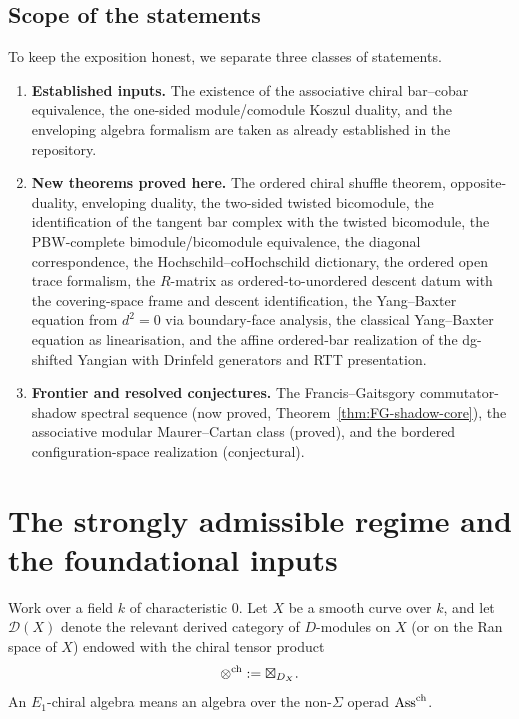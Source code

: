 \subsection*{Scope of the statements}
To keep the exposition honest, we separate three classes of statements.

\begin{enumerate}[label=(\roman*)]
\item \textbf{Established inputs.}
The existence of the associative chiral bar--cobar equivalence, the one-sided module/comodule
Koszul duality, and the enveloping algebra formalism are taken as already established in the
repository.

\item \textbf{New theorems proved here.}
The ordered chiral shuffle theorem, opposite-duality, enveloping duality, the two-sided twisted
bicomodule, the identification of the tangent bar complex with the twisted bicomodule, the PBW-complete
bimodule/bicomodule equivalence, the diagonal correspondence, the Hochschild--coHochschild
dictionary, the ordered open trace formalism, the $R$-matrix as
ordered-to-unordered descent datum with the covering-space frame and descent identification,
the Yang--Baxter equation from $d^2=0$ via boundary-face analysis, the classical
Yang--Baxter equation as linearisation, and the affine ordered-bar
realization of the dg-shifted Yangian with Drinfeld generators and
RTT presentation.

\item \textbf{Frontier and resolved conjectures.}
The Francis--Gaitsgory commutator-shadow spectral sequence (now proved,
Theorem~\ref{thm:FG-shadow-core}), the associative modular Maurer--Cartan
class (proved), and the bordered configuration-space realization (conjectural).
\end{enumerate}

\section{The strongly admissible regime and the foundational inputs}

Work over a field $k$ of characteristic $0$. Let $X$ be a smooth curve over $k$, and let
$\mathcal D(X)$ denote the relevant derived category of $D$-modules on $X$ (or on the Ran space of
$X$) endowed with the chiral tensor product
\[
\mathbin{\otimes^{\mathrm{ch}}} := \boxtimes_{D_X}.
\]
An $E_1$-chiral algebra means an algebra over the non-$\Sigma$ operad $\mathrm{Ass}^{\mathrm{ch}}$.


